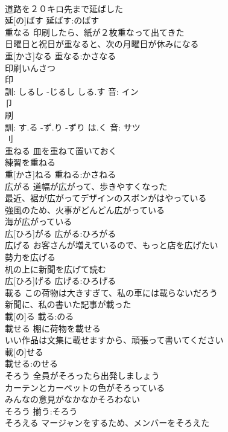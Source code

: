 \documentclass[8pt]{extreport}
\begin{document}
\begin{CJK}{UTF8}{min}
\\	道路を２０キロ先まで延ばした 
\\	延[の]ばす			延ばす:のばす
\\	重なる	印刷したら、紙が２枚重なって出てきた 
\\	日曜日と祝日が重なると、次の月曜日が休みになる 
\\	重[かさ]なる			重なる:かさなる
\\	印刷いんさつ
\\	印 
\\	訓: しるし -じるし しる.す 音: イン 
\\	卩 
\\	刷 
\\	訓: す.る -ず.り -ずり は.く 音: サツ 
\\	刂 
\\	重ねる	皿を重ねて置いておく 
\\	練習を重ねる 
\\	重[かさ]ねる			重ねる:かさねる
\\	広がる	道幅が広がって、歩きやすくなった 
\\	最近、裾が広がってデザインのスボンがはやっている 
\\	強風のため、火事がどんどん広がっている 
\\	海が広がっている 
\\	広[ひろ]がる			広がる:ひろがる
\\	広げる	お客さんが増えているので、もっと店を広げたい 
\\	勢力を広げる 
\\	机の上に新聞を広げて読む 
\\	広[ひろ]げる			広げる:ひろげる
\\	載る	この荷物は大きすぎて、私の車には載らないだろう 
\\	新聞に、私の書いた記事が載った 
\\	載[の]る			載る:のる
\\	載せる	棚に荷物を載せる 
\\	いい作品は文集に載せますから、頑張って書いてください 
\\	載[の]せる		
\\	載せる:のせる
\\	そろう	全員がそろったら出発しましょう 
\\	カーテンとカーペットの色がそろっている 
\\	みんなの意見がなかなかそろわない 
\\	そろう			揃う:そろう
\\	そろえる	マージャンをするため、メンバーをそろえた 

\end{CJK}
\end{document}
